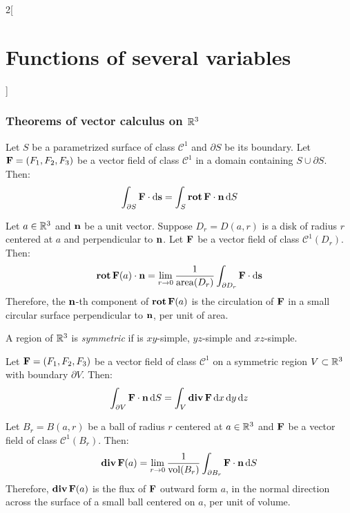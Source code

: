 \documentclass[../../../main_math.tex]{subfiles}
\begin{document}
\begin{multicols}{2}[\section{Functions of several variables}]
  \subsubsection{Theorems of vector calculus on \texorpdfstring{$\mathbb{R}^3$}{R3}}
  \begin{theorem}\label{FSV:stokes}
    Let $S$ be a parametrized surface of class $\mathcal{C}^1$ and $\partial S$ be its boundary. Let $\boldsymbol{\mathrm{F}}=(F_1,F_2,F_3)$ be a vector field of class $\mathcal{C}^1$ in a domain containing $S\cup\partial S$. Then: $$\int_{\partial S}\boldsymbol{\mathrm{F}}\cdot \dd{\boldsymbol{\mathrm{s}}}=\int_S\operatorname{\boldsymbol{\mathrm{rot}}}\boldsymbol{\mathrm{F}}\cdot\boldsymbol{\mathrm{n}} \dd{S}$$
  \end{theorem}
  \begin{corollary}
    Let $a\in\mathbb{R}^3$ and $\boldsymbol{\mathrm{n}}$ be a unit vector. Suppose $D_r=D(a,r)$ is a disk of radius $r$ centered at $a$ and perpendicular to $\boldsymbol{\mathrm{n}}$. Let $\boldsymbol{\mathrm{F}}$ be a vector field of class $\mathcal{C}^1(D_r)$. Then: $$\operatorname{\boldsymbol{\mathrm{rot}}}\boldsymbol{\mathrm{F}}(a)\cdot\boldsymbol{\mathrm{n}}=\lim_{r\to 0}\frac{1}{\operatorname{area}(D_r)}\int_{\partial D_r}\boldsymbol{\mathrm{F}}\cdot \dd{\boldsymbol{\mathrm{s}}}$$ Therefore, the $\boldsymbol{\mathrm{n}}$-th component of $\operatorname{\boldsymbol{\mathrm{rot}}}\boldsymbol{\mathrm{F}}(a)$ is the circulation of $\boldsymbol{\mathrm{F}}$ in a small circular surface perpendicular to $\boldsymbol{\mathrm{n}}$, per unit of area.
  \end{corollary}
  \begin{definition}
    A region of $\mathbb{R}^3$ is \emph{symmetric} if is $xy$-simple, $yz$-simple and $xz$-simple.
  \end{definition}
  \begin{theorem}\label{FSV:divergencethm}
    Let $\boldsymbol{\mathrm{F}}=(F_1,F_2,F_3)$ be a vector field of class $\mathcal{C}^1$ on a symmetric region $V\subset\mathbb{R}^3$ with boundary $\partial V$. Then: $$\int_{\partial V}\boldsymbol{\mathrm{F}}\cdot\boldsymbol{\mathrm{n}} \dd{S}=\int_V\operatorname{\boldsymbol{\mathrm{div}}}\boldsymbol{\mathrm{F}}\dd{x}\dd{y}\dd{z}$$
  \end{theorem}
  \begin{corollary}
    Let $B_r=B(a,r)$ be a ball of radius $r$ centered at $a\in\mathbb{R}^3$ and $\boldsymbol{\mathrm{F}}$ be a vector field of class $\mathcal{C}^1(B_r)$. Then: $$\operatorname{\boldsymbol{\mathrm{div}}}\boldsymbol{\mathrm{F}}(a)=\lim_{r\to 0}\frac{1}{\text{vol}(B_r)}\int_{\partial B_r}\boldsymbol{\mathrm{F}}\cdot\boldsymbol{\mathrm{n}} \dd{S}$$ Therefore, $\operatorname{\boldsymbol{\mathrm{div}}}\boldsymbol{\mathrm{F}}(a)$ is the flux of $\boldsymbol{\mathrm{F}}$ outward form $a$, in the normal direction across the surface of a small ball centered on $a$, per unit of volume.
  \end{corollary}
\end{multicols}
\end{document}
